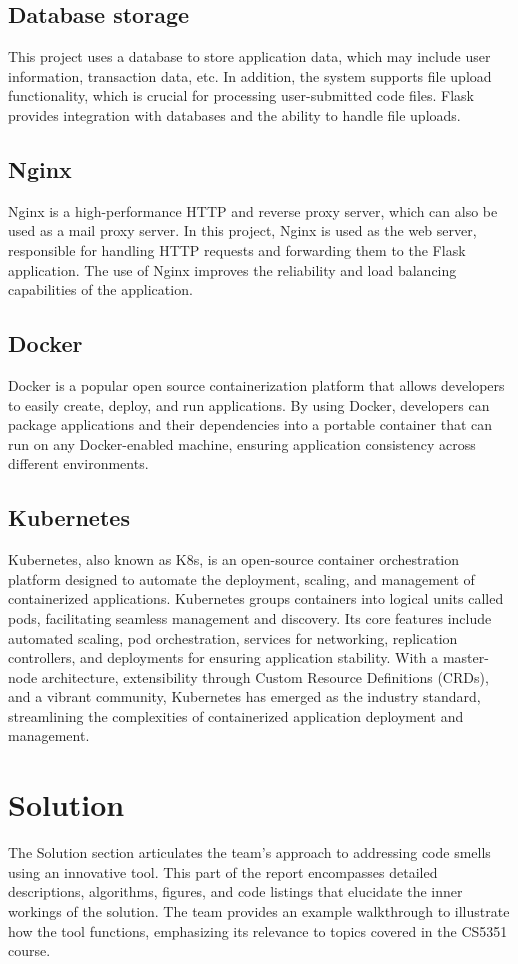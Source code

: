 \documentclass[journal]{IEEEtran}
\begin{document}
\subsection{Database storage}
This project uses a database to store application data, which may include user information, transaction data, etc. In addition, the system supports file upload functionality, which is crucial for processing user-submitted code files. Flask provides integration with databases and the ability to handle file uploads.

\subsection{Nginx}
Nginx is a high-performance HTTP and reverse proxy server, which can also be used as a mail proxy server. In this project, Nginx is used as the web server, responsible for handling HTTP requests and forwarding them to the Flask application. The use of Nginx improves the reliability and load balancing capabilities of the application.

\subsection{Docker}
Docker is a popular open source containerization platform that allows developers to easily create, deploy, and run applications. By using Docker, developers can package applications and their dependencies into a portable container that can run on any Docker-enabled machine, ensuring application consistency across different environments.

\subsection{Kubernetes}
Kubernetes, also known as K8s, is an open-source container orchestration platform designed to automate the deployment, scaling, and management of containerized applications.  Kubernetes groups containers into logical units called pods, facilitating seamless management and discovery. Its core features include automated scaling, pod orchestration, services for networking, replication controllers, and deployments for ensuring application stability. With a master-node architecture, extensibility through Custom Resource Definitions (CRDs), and a vibrant community, Kubernetes has emerged as the industry standard, streamlining the complexities of containerized application deployment and management.


\section{Solution}
\noindent The Solution section articulates the team's approach to addressing code smells using an innovative tool. This part of the report encompasses detailed descriptions, algorithms, figures, and code listings that elucidate the inner workings of the solution. The team provides an example walkthrough to illustrate how the tool functions, emphasizing its relevance to topics covered in the CS5351 course.
\end{document}
